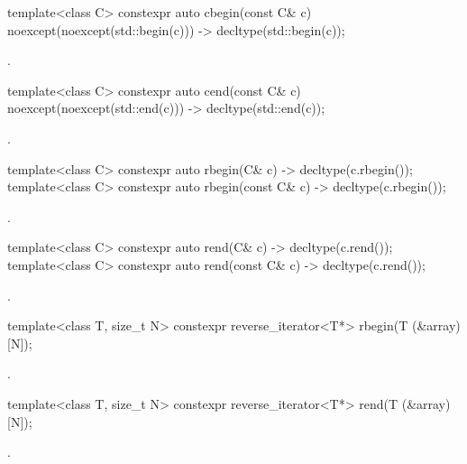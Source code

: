 %
\begin{itemdecl}
template<class C> constexpr auto cbegin(const C& c) noexcept(noexcept(std::begin(c)))
  -> decltype(std::begin(c));
\end{itemdecl}
\begin{itemdescr}
\pnum
\returns
{}.
\end{itemdescr}

%
\begin{itemdecl}
template<class C> constexpr auto cend(const C& c) noexcept(noexcept(std::end(c)))
  -> decltype(std::end(c));
\end{itemdecl}
\begin{itemdescr}
\pnum
\returns
{}.
\end{itemdescr}

%
\begin{itemdecl}
template<class C> constexpr auto rbegin(C& c) -> decltype(c.rbegin());
template<class C> constexpr auto rbegin(const C& c) -> decltype(c.rbegin());
\end{itemdecl}
\begin{itemdescr}
\pnum
\returns
{}.
\end{itemdescr}

%
\begin{itemdecl}
template<class C> constexpr auto rend(C& c) -> decltype(c.rend());
template<class C> constexpr auto rend(const C& c) -> decltype(c.rend());
\end{itemdecl}
\begin{itemdescr}
\pnum
\returns
{}.
\end{itemdescr}

%
\begin{itemdecl}
template<class T, size_t N> constexpr reverse_iterator<T*> rbegin(T (&array)[N]);
\end{itemdecl}
\begin{itemdescr}
\pnum
\returns
{}.
\end{itemdescr}

%
\begin{itemdecl}
template<class T, size_t N> constexpr reverse_iterator<T*> rend(T (&array)[N]);
\end{itemdecl}
\begin{itemdescr}
\pnum
\returns
{}.
\end{itemdescr}

